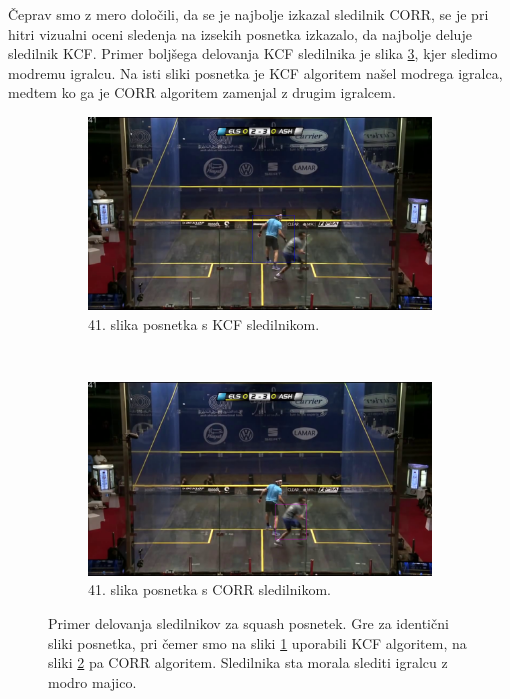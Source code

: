 Čeprav smo z mero določili, da se je najbolje izkazal sledilnik CORR, se je pri hitri vizualni oceni sledenja na izsekih posnetka \cite{squashtv2014squash} izkazalo, da najbolje deluje sledilnik KCF. Primer boljšega delovanja KCF sledilnika je slika \ref{fig:squash-tracker-visual}, kjer sledimo modremu igralcu. Na isti sliki posnetka je KCF algoritem našel modrega igralca, medtem ko ga je CORR algoritem zamenjal z drugim igralcem. 



\begin{figure}[htb]
\centering

	\begin{subfigure}[t]{0.45\columnwidth}
      \includegraphics[width=\columnwidth]{./Slike/squash-1-kcf-example.png}
      \caption{41. slika posnetka \cite{squashtv2014squash} s KCF sledilnikom.}
      \label{fig:squash-1-kcf}
    \end{subfigure}
    ~
    \begin{subfigure}[t]{0.45\columnwidth}
      \includegraphics[width=\columnwidth]{./Slike/squash-1-corr-example.png}
      \caption{41. slika posnetka \cite{squashtv2014squash} s CORR sledilnikom.}
      \label{fig:squash-1-corr}
    \end{subfigure}  
\caption[Primer delovanja sledilnikov za squash posnetek]{Primer delovanja sledilnikov za squash posnetek. Gre za identični sliki posnetka, pri čemer smo na sliki \ref{fig:squash-1-kcf} uporabili KCF algoritem, na sliki \ref{fig:squash-1-corr} pa CORR algoritem. Sledilnika sta morala slediti igralcu z modro majico.}
\label{fig:squash-tracker-visual}
\end{figure}


